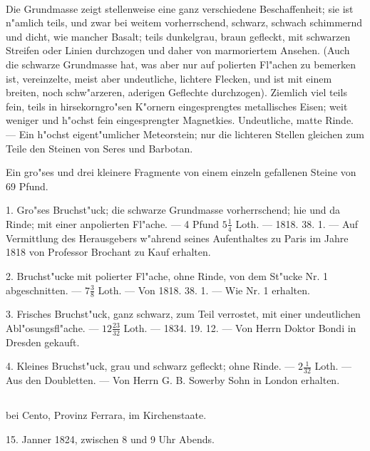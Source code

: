 \documentclass[a4paper, 11pt, oneside, polutonikogreek, german]{article}
\begin{document}
\paragraph{}
Die Grundmasse zeigt stellenweise eine ganz verschiedene Beschaffenheit; sie ist n"amlich teils, und zwar bei weitem vorherrschend, schwarz, schwach schimmernd und dicht, wie mancher Basalt; teils dunkelgrau, braun gefleckt, mit schwarzen Streifen oder Linien durchzogen und daher von marmoriertem Ansehen. (Auch die schwarze Grundmasse hat, was aber nur auf polierten Fl"achen zu bemerken ist, vereinzelte, meist aber undeutliche, lichtere Flecken, und ist mit einem breiten, noch schw"arzeren, aderigen Geflechte durchzogen). Ziemlich viel teils fein, teils in hirsekorngro"sen K"ornern eingesprengtes metallisches Eisen; weit weniger und h"ochst fein eingesprengter Magnetkies. Undeutliche, matte Rinde. --- Ein h"ochst eigent"umlicher Meteorstein; nur die lichteren Stellen gleichen zum Teile den Steinen von Seres und Barbotan.

Ein gro"ses und drei kleinere Fragmente von einem einzeln gefallenen Steine von 69 Pfund.

1. Gro"ses Bruchst"uck; die schwarze Grundmasse vorherrschend; hie und da Rinde; mit einer anpolierten Fl"ache. --- 4 Pfund $\mathfrak{5\frac{1}{4}}$ Loth. --- 1818. 38. 1. --- Auf Vermittlung des Herausgebers w"ahrend seines Aufenthaltes zu Paris im Jahre 1818 von Professor Brochant zu Kauf erhalten.

2. Bruchst"ucke mit polierter Fl"ache, ohne Rinde, von dem St"ucke Nr. 1 abgeschnitten. --- $\mathfrak{7\frac{3}{8}}$ Loth. --- Von 1818. 38. 1. --- Wie Nr. 1 erhalten.

3. Frisches Bruchst"uck, ganz schwarz, zum Teil verrostet, mit einer undeutlichen Abl"osungsfl"ache. --- $\mathfrak{12\frac{23}{32}}$ Loth. --- 1834. 19. 12. --- Von Herrn Doktor Bondi in Dresden gekauft.

4. Kleines Bruchst"uck, grau und schwarz gefleckt; ohne Rinde. --- $\mathfrak{2\frac{1}{32}}$ Loth. --- Aus den Doubletten. --- Von Herrn G. B. Sowerby Sohn in London erhalten.
\subsection[\swabfamily {Renazzo.}]{}
\begin{center}

bei Cento, Provinz Ferrara, im Kirchenstaate.

15. Janner 1824, zwischen 8 und 9 Uhr Abends.
\end{center}
\end{document}

